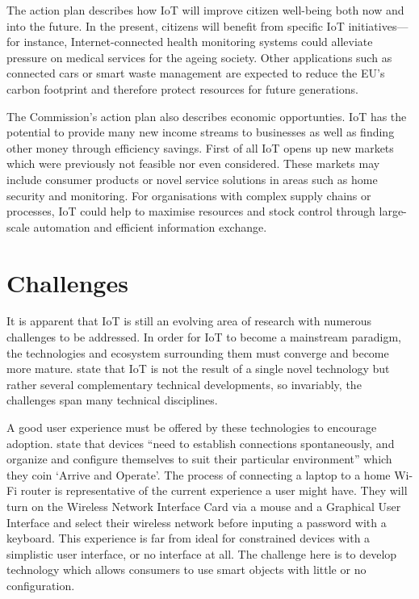     The action plan \citep{ECIoT:2009} describes how IoT will improve citizen well-being both now and into the future. In the present, citizens will benefit from specific IoT initiatives---for instance, Internet-connected health monitoring systems could alleviate pressure on medical services for the ageing society. Other applications such as connected cars or smart waste management are expected to reduce the EU's carbon footprint and therefore protect resources for future generations.

    The Commission's action plan also describes economic opportunties. IoT has the potential to provide many new income streams to businesses as well as finding other money through efficiency savings. First of all IoT opens up new markets which were previously not feasible nor even considered. These markets may include consumer products or novel service solutions in areas such as home security and monitoring. For organisations with complex supply chains or processes, IoT could help to maximise resources and stock control through large-scale automation and efficient information exchange.

  \section{Challenges}
  \label{challenges}
    It is apparent that IoT is still an evolving area of research with numerous challenges to be addressed. In order for IoT to become a mainstream paradigm, the technologies and ecosystem surrounding them must converge and become more mature. \citet{fromIoC} state that IoT is not the result of a single novel technology but rather several complementary technical developments, so invariably, the challenges span many technical disciplines. 

    A good user experience must be offered by these technologies to encourage adoption. \citet{fromIoC} state that devices ``need to establish connections spontaneously, and organize and configure themselves to suit their particular environment'' which they coin `Arrive and Operate'. The process of connecting a laptop to a home Wi-Fi router is representative of the current experience a user might have. They will turn on the Wireless Network Interface Card via a mouse and a Graphical User Interface and select their wireless network before inputing a password with a keyboard. This experience is far from ideal for constrained devices with a simplistic user interface, or no interface at all. The challenge here is to develop technology which allows consumers to use smart objects with little or no configuration.

